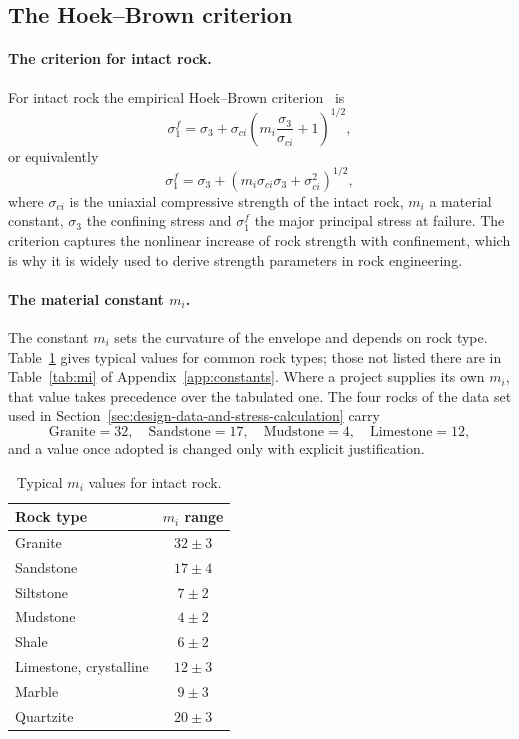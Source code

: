 \subsection{The Hoek--Brown criterion}
\label{sec:hoek-brown-intact}

\paragraph{The criterion for intact rock.}
For intact rock the empirical Hoek--Brown
criterion~\citep{hoekbrown1980underground,hoek2019hb} is
\[
\sigma_1^f =
\sigma_3 + \sigma_{ci}
\left(
m_i\frac{\sigma_3}{\sigma_{ci}} + 1
\right)^{1/2} ,
\]
or equivalently
\[
\sigma_1^f =
\sigma_3 +
\left(
m_i\sigma_{ci}\sigma_3 + \sigma_{ci}^{2}
\right)^{1/2} ,
\]
where \(\sigma_{ci}\) is the uniaxial compressive strength of the intact
rock, \(m_i\) a material constant, \(\sigma_3\) the confining stress and
\(\sigma_1^f\) the major principal stress at failure. The criterion captures
the nonlinear increase of rock strength with confinement, which is why it is
widely used to derive strength parameters in rock engineering.

\paragraph{The material constant \(m_i\).}
The constant \(m_i\) sets the curvature of the envelope and depends on rock
type. Table~\ref{tab:mi_values} gives typical values for common rock types;
those not listed there are in Table~\ref{tab:mi} of
Appendix~\ref{app:constants}. Where a project supplies its own \(m_i\), that
value takes precedence over the tabulated one. The four rocks of the data set
used in Section~\ref{sec:design-data-and-stress-calculation} carry
\[
\text{Granite}=32,\quad
\text{Sandstone}=17,\quad
\text{Mudstone}=4,\quad
\text{Limestone}=12 ,
\]
and a value once adopted is changed only with explicit justification.

\begin{table}[htbp]
\caption{Typical \(m_i\) values for intact rock.}
\label{tab:mi_values}
\centering
\small
\begin{tabular}{l c}
\toprule
\textbf{Rock type} & \textbf{\(m_i\) range} \\
\midrule
Granite & \(32 \pm 3\) \\
Sandstone & \(17 \pm 4\) \\
Siltstone & \(7 \pm 2\) \\
Mudstone & \(4 \pm 2\) \\
Shale & \(6 \pm 2\) \\
Limestone, crystalline & \(12 \pm 3\) \\
Marble & \(9 \pm 3\) \\
Quartzite & \(20 \pm 3\) \\
\bottomrule
\end{tabular}
\end{table}

